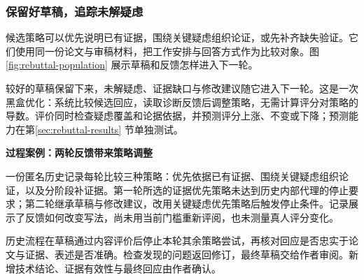 \subsubsection{保留好草稿，追踪未解疑虑}
候选策略可以优先说明已有证据，围绕关键疑虑组织论证，或先补齐缺失验证。它们使用同一份论文与审稿材料，把工作安排与回答方式作为比较对象。图\ref{fig:rebuttal-population} 展示草稿和反馈怎样进入下一轮。


较好的草稿保留下来，未解疑虑、证据缺口与修改建议随它进入下一轮。这是一次黑盒优化：系统比较候选回应，读取诊断反馈后调整策略，无需计算评分对策略的导数。评价同时检查疑虑覆盖和论据依据，并预测评分上涨、不变或下降；预测能力在第\ref{sec:rebuttal-results} 节单独测试。

\begin{insight}
\textbf{过程案例：两轮反馈带来策略调整}\par
一份匿名历史记录每轮比较三种策略：优先依据已有证据、围绕关键疑虑组织论证，以及分阶段补证据。第一轮所选的证据优先策略未达到历史内部代理的停止要求；第二轮继承草稿与修改建议，改用关键疑虑优先策略后触发停止条件。记录展示了反馈如何改变写法，尚未用当前门槛重新评阅，也未测量真人评分变化。
\end{insight}

历史流程在草稿通过内容评价后停止本轮其余策略尝试，再核对回应是否忠实于论文与证据、表述是否准确。检查发现的问题返回修订，最终草稿交给作者审阅。新增技术结论、证据有效性与最终回应由作者确认。
